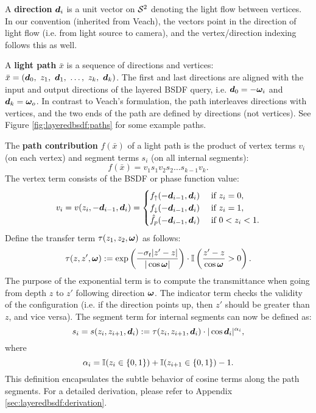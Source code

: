A {\bf direction} $\bm{d}_i$ is a unit vector on ${\mathcal S^2}$ denoting the light flow between vertices. In our convention (inherited from Veach), 
the vectors point in the direction of light flow (i.e. from light source to camera), and the vertex/direction indexing follows this as well.

A {\bf light path} $\bar x$ is a sequence of directions and vertices: $\bar x = (\bd_0,\ z_1,\ \bd_1,\ \dots,\ z_k,\ \bd_k)$.
The first and last directions are aligned with the input and output directions of the layered BSDF query, i.e. $\bm{d}_0 = -\bm{\omega}_i$ and $\bm{d}_k = \bm{\omega}_o$. In contrast to Veach's formulation, the path interleaves directions with vertices, and the two ends of the path are defined by directions (not vertices). See Figure \ref{fig:layeredbsdf:paths} for some example paths.



The {\bf path contribution} $f(\bar x)$ of a light path is the product of vertex terms $v_i$ (on each vertex) and segment terms $s_i$ (on all internal segments):
\begin{equation}
	f(\bar x) = v_1 s_1 v_2 s_2 \dots s_{k-1} v_k.
\end{equation}
The vertex term consists of the BSDF or phase function value:
\begin{equation}
\label{eqn:vtx_contrib}
v_i = v(z_i, -\bm{d}_{i - 1}, \bm{d}_i)
= \begin{cases}
	f_\uparrow(-\bm{d}_{i-1}, \bm{d}_i)   & \mbox{  if  } z_i = 0,\\
	f_\downarrow(-\bm{d}_{i-1}, \bm{d}_i) & \mbox{  if  } z_i = 1,\\
  	\hat{f}_p(-\bm{d}_{i-1}, \bm{d}_i)    & \mbox{  if  } 0 < z_i < 1.
\end{cases}
\end{equation}
Define the transfer term $\tau(z_1, z_2, \bm{\omega})$ as follows:
\begin{equation}
\tau(z, z', \bm{\omega}) := \exp \left( \frac{-\sigma_t |z' - z|}{|\cos \bm{\omega}|} \right) \cdot \mathbb{I} \left( \frac{z' - z}{\cos \bm{\omega}} > 0 \right).
\end{equation}
The purpose of the exponential term is to compute the transmittance when going from depth $z$ to $z'$ following direction $\bm{\omega}$.
The indicator term checks the validity of the configuration (i.e. if the direction points up, then $z'$ should be greater than $z$, and vice versa). The segment term for internal segments can now be defined as:
\begin{equation}
\label{eqn:seg_contrib}
s_i = s(z_i, z_{i + 1}, \bm{d}_i) := \tau(z_i, z_{i+1}, \bm{d}_i) \cdot |\cos \bm{d}_i|^{\alpha_i},
\end{equation}
where
\begin{equation}
\label{eqn:seg_contrib_cosine}
\alpha_i = \mathbb{I}(z_i \in \{0,1\}) + \mathbb{I}(z_{i + 1} \in \{0,1\}) - 1.
\end{equation}
This definition encapsulates the subtle behavior of cosine terms along the path segments.
For a detailed derivation, please refer to Appendix \ref{sec:layeredbsdf:derivation}.

